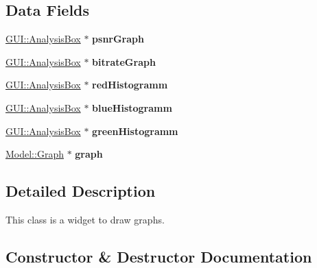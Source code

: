 \subsection*{Data Fields}
\begin{DoxyCompactItemize}
\item 
\hypertarget{classGUI_1_1GraphWidget_a8eb06e20b4d45dae183529cdbcfccd37}{}\hyperlink{classGUI_1_1AnalysisBox}{G\+U\+I\+::\+Analysis\+Box} $\ast$ {\bfseries psnr\+Graph}\label{classGUI_1_1GraphWidget_a8eb06e20b4d45dae183529cdbcfccd37}

\item 
\hypertarget{classGUI_1_1GraphWidget_a0820983260f94179618b2d20660fccb8}{}\hyperlink{classGUI_1_1AnalysisBox}{G\+U\+I\+::\+Analysis\+Box} $\ast$ {\bfseries bitrate\+Graph}\label{classGUI_1_1GraphWidget_a0820983260f94179618b2d20660fccb8}

\item 
\hypertarget{classGUI_1_1GraphWidget_abbcef0fcdc2fe6a2fcf4f1c7dc894616}{}\hyperlink{classGUI_1_1AnalysisBox}{G\+U\+I\+::\+Analysis\+Box} $\ast$ {\bfseries red\+Histogramm}\label{classGUI_1_1GraphWidget_abbcef0fcdc2fe6a2fcf4f1c7dc894616}

\item 
\hypertarget{classGUI_1_1GraphWidget_ae1216a2a17f8e93ec56dadca439499e2}{}\hyperlink{classGUI_1_1AnalysisBox}{G\+U\+I\+::\+Analysis\+Box} $\ast$ {\bfseries blue\+Histogramm}\label{classGUI_1_1GraphWidget_ae1216a2a17f8e93ec56dadca439499e2}

\item 
\hypertarget{classGUI_1_1GraphWidget_a262e4b4b63ed00cb7e29d0e80096cc48}{}\hyperlink{classGUI_1_1AnalysisBox}{G\+U\+I\+::\+Analysis\+Box} $\ast$ {\bfseries green\+Histogramm}\label{classGUI_1_1GraphWidget_a262e4b4b63ed00cb7e29d0e80096cc48}

\item 
\hypertarget{classGUI_1_1GraphWidget_ab3ea51551e457dd2373457329db2651e}{}\hyperlink{classModel_1_1Graph}{Model\+::\+Graph} $\ast$ {\bfseries graph}\label{classGUI_1_1GraphWidget_ab3ea51551e457dd2373457329db2651e}

\end{DoxyCompactItemize}


\subsection{Detailed Description}
This class is a widget to draw graphs. 

\subsection{Constructor \& Destructor Documentation}
\hypertarget{classGUI_1_1GraphWidget_a6d80d51caf0aee4c148baee49978f8c3}{}
